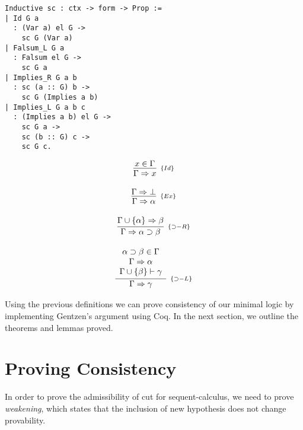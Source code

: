\documentclass[12pt]{article}
\theoremstyle{definition}
\begin{document}
\begin{minipage}[c]{0.6\textwidth}
\begin{lstlisting}
Inductive sc : ctx -> form -> Prop :=
| Id G a
  : (Var a) el G ->
    sc G (Var a)
| Falsum_L G a
  : Falsum el G ->
    sc G a
| Implies_R G a b
  : sc (a :: G) b ->
    sc G (Implies a b)
| Implies_L G a b c
  : (Implies a b) el G ->
    sc G a ->
    sc (b :: G) c ->
    sc G c.  
\end{lstlisting}
\end{minipage}
\begin{minipage}[c]{0.3\textwidth}
\[
\begin{array}{c}
\infer[_{\{Id\}}]{\Gamma \Rightarrow x}{x \in \Gamma} \\ \\
\infer[_{\{Ex\}}]{\Gamma \Rightarrow \alpha}{\Gamma \Rightarrow \bot}\\ \\
\infer[_{\{\supset-R\}}]{\Gamma \Rightarrow \alpha \supset \beta}{\Gamma \cup \{\alpha\} \Rightarrow \beta}\\ \\
  \infer[_{\{\supset-L\}}]{\Gamma \Rightarrow \gamma}{\begin{array}{c}
                                                       \alpha \supset \beta \in
                                                        \Gamma \\
                                                        \Gamma \Rightarrow
                                                        \alpha \\ \Gamma \cup
                                                        \{\beta\}\vdash \gamma
                                                    \end{array}}
\end{array}
\]
\end{minipage}

Using the previous definitions we can prove consistency of our minimal logic by
implementing Gentzen's argument using Coq. In the next section, we outline the
theorems and lemmas proved.

\section{Proving Consistency}

In order to prove the admissibility of cut for sequent-calculus, we need to
prove \emph{weakening}, which states that the inclusion of new hypothesis does
not change provability.
\end{document}
